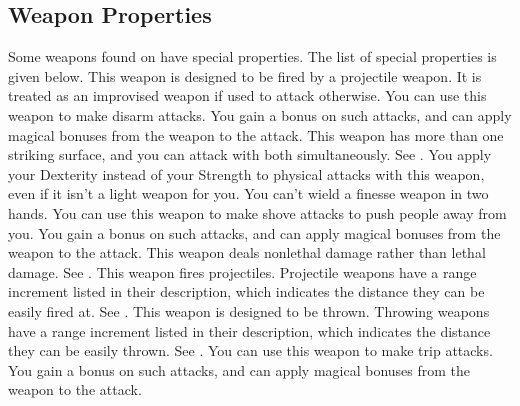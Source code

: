 \subsection{Weapon Properties}
Some weapons found on  have special properties. The list of special properties is given below.
 This weapon is designed to be fired by a projectile weapon. It is treated as an improvised weapon if used to attack otherwise.
 You can use this weapon to make disarm attacks. You gain a  bonus on such attacks, and can apply magical bonuses from the weapon to the attack.
 This weapon has more than one striking surface, and you can attack with both simultaneously. See .
 You apply your Dexterity instead of your Strength to physical attacks with this weapon, even if it isn't a light weapon for you. You can't wield a finesse weapon in two hands.
 You can use this weapon to make shove attacks to push people away from you. You gain a  bonus on such attacks, and can apply magical bonuses from the weapon to the attack.
 This weapon deals nonlethal damage rather than lethal damage. See .
 This weapon fires projectiles. Projectile weapons have a range increment listed in their description, which indicates the distance they can be easily fired at. See .
 This weapon is designed to be thrown. Throwing weapons have a range increment listed in their description, which indicates the distance they can be easily thrown. See .
 You can use this weapon to make trip attacks. You gain a  bonus on such attacks, and can apply magical bonuses from the weapon to the attack.


